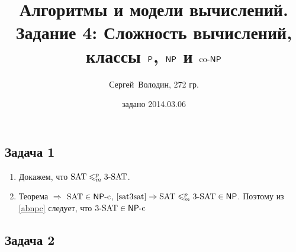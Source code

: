 \documentclass[a4paper]{article}
\date{задано 2014.03.06}
\author{Сергей~Володин, 272 гр.}
\title{Алгоритмы и модели вычислений.\\Задание 4: Сложность вычислений, классы ${\mathsf{P}}$, $\NP$ и ${\rm co}\text{-}{\mathsf{NP}}$}
\def\NP{{\mathsf{NP}}}
\def\NPc{{\mathsf{NP}}\text{-}{\rm c}}
\def\SAT{{\rm{SAT}}}
\def\3SAT{{\rm{3\text{-}SAT}}}
\begin{document}
\maketitle
\subsection*{Задача 1}
\begin{enumerate}
\item \label{sat3sat} Докажем, что $\SAT\leqslant_m^p \3SAT$.
\item Теорема $\Rightarrow$ $\SAT\in\NPc$, $\ref{sat3sat}\Rightarrow\SAT\leqslant_m^p \3SAT\in \NP$. Поэтому из \ref{abnpc} следует, что $\3SAT\in \NPc$
\end{enumerate}
\subsection*{Задача 2}
\end{document}
